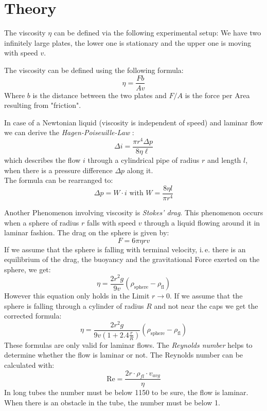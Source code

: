 \section{Theory}

The viscosity $\eta$ can be defined via the following experimental setup: We have two infinitely large plates, the lower one is stationary and the upper one is moving with speed $v$.

The viscosity can be defined using the following formula:
\begin{equation}
    \eta = \frac{F b}{A v} \label{eq:vis}
\end{equation}
Where $b$ is the distance between the two plates and $F/A$ is the force per Area resulting from "friction".

In case of a Newtonian liquid (viscosity is independent of speed) and laminar flow  we can derive the \emph{Hagen-Poiseuille-Law} :
\begin{equation}
   \Delta i = \frac{\pi r^4 \Delta p}{8 \eta \ell} \label{eq:hp}
\end{equation}
which describes the flow $i$ through a cylindrical pipe of radius $r$ and length $l$, when there is a pressure difference $\Delta p$ along it.\\
The formula can be rearranged to:
\begin{equation}
\Delta p = W \cdot i \text{ with } W = \frac{8\eta l}{\pi r^4}
\label{eq:pressure}
\end{equation}


Another Phenomenon involving viscosity is \emph{Stokes' drag}. This phenomenon occurs when a sphere of radius $r$ falls with speed $v$ through a liquid flowing around it in laminar fashion. The drag on the sphere is given by:
\begin{equation}
    F = 6 \pi \eta r v \label{eq:stokes}
\end{equation}
If we assume that the sphere is falling with terminal velocity, i.\,e. there is an equilibrium of the drag, the buoyancy and the gravitational Force exerted on the sphere, we get:
\begin{equation}
    \eta = \frac{2 r^2 g}{9 v}(\rho_\mathrm{sphere} - \rho_\mathrm{fl}) \label{eq:termid}
\end{equation}
However this equation only holds in the Limit $r \to 0$. 
If we assume that the sphere is falling through a cylinder of radius $R$ and not near the caps we get the corrected formula:
\begin{equation}
    \eta = \frac{2 r^2 g}{9 v \left( 1 + 2.4 \frac{r}{R} \right)}(\rho_\mathrm{sphere} - \rho_\mathrm{fl}) \label{eq:term}
\end{equation}
These formulas are only valid for laminar flows. The \emph{Reynolds number} helps to determine whether the flow is laminar or not. The Reynolds number can be calculated with:
\begin{equation}
\text{Re} = \frac{2r\cdot \rho_ {fl} \cdot v_{avg}}{\eta}
\label{eq:reynold}
\end{equation}
In long tubes the number must be below 1150 to be sure, the flow is laminar. When there is an obstacle in the tube, the number must be below 1.




